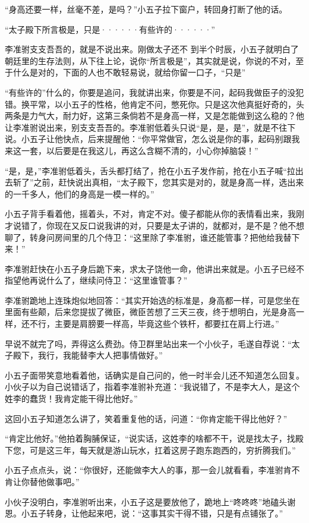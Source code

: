 “身高还要一样，丝毫不差，是吗？”小五子拉下窗户，转回身打断了他的话。

“太子殿下所言极是，只是······有些许的······”

李准驸支支吾吾的，就是不说出来。刚做太子还不
到半个时辰，小五子就明白了朝廷里的生存法则，从下往上论，说你“所言极是”，其实就是说，你说的不对，至于什么是对的，下面的人也不敢轻易说，就给你留一口子，“只是”

“有些许的”什么的，你要是追问，我就讲出来，你要是不问，起码我做臣子的没犯错。换平常，以小五子的性格，他肯定不问，憋死你。只是这次他真挺好奇的，头两条是力气大，耐力好，这第三条倘若不是身高一样，又是怎能做到这么稳的？他让李准驸说出来，别支支吾吾的。李准驸低着头只说“是，是，是”，就是不往下说。小五子让他快点，后来提醒他：“你平常做官，怎么说是你的事，起码别跟我来这一套，以后要是在我这儿，再这么含糊不清的，小心你掉脑袋！”

“是，是，”李准驸低着头，舌头都打结了，抢在小五子发作前，抢在小五子喊“拉出去斩了”之前，赶快说出真相，“太子殿下，您其实是对的，就是身高一样，选出来的一千多人，他们的身高是一模一样的。”

小五子背手看着他，摇着头，不对，肯定不对。傻子都能从你的表情看出来，我刚才说错了，你现在又反口说我讲的对，只要是太子讲的，就都对，是不是？他不想聊了，转身问房间里的几个侍卫：“这里除了李准驸，谁还能管事？把他给我替下来！”

李准驸赶快在小五子身后跪下来，求太子饶他一命，他讲出来就是。小五子已经不指望他再说什么了，继续问侍卫：“这里谁管事？”

李准驸跪地上连珠炮似地回答：“其实开始选的标准是，身高都一样，可是您坐在里面有些颠，后来您提拔了微臣，微臣苦想了三天三夜，终于想明白，光是身高一样，还不行，主要是肩膀要一样高，毕竟这些个铁杆，都要扛在肩上行进。”

早说不就完了吗，弄得这么费劲。侍卫群里站出来一个小伙子，毛遂自荐说：“太子殿下，我行，我能替李大人把事情做好。”

小五子面带笑意地看着他，话确实是自己问的，他一时半会儿还不知道怎么回复。小伙子以为自己说错话了，指着李准驸补充道：“我说错了，不是李大人，是这个姓李的蠢货！我肯定能干得比他好。”

这回小五子知道怎么讲了，笑着重复他的话，问道：“你肯定能干得比他好？”

“肯定比他好。”他拍着胸脯保证，“说实话，这姓李的啥都不干，说是找太子，找殿下您，可是这三年，每天就是游山玩水，扛着这房子跑东跑西的，穷折腾我们。”

小五子点点头，说：“你很好，还能做李大人的事，那一会儿就看看，李准驸肯不肯让你替他做事吧。”

小伙子没明白，李准驸听出来，小五子这是要放他了，跪地上“咚咚咚”地磕头谢恩。小五子转身，让他起来吧，说：“这事其实干得不错，只是有点铺张了。”


